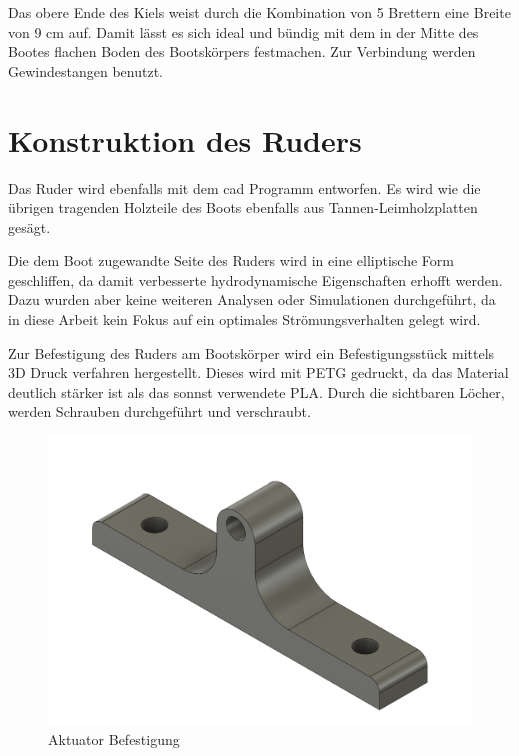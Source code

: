 Das obere Ende des Kiels weist durch die Kombination von 5 Brettern eine Breite von 9 cm auf. Damit lässt es sich ideal und bündig mit dem in der Mitte des Bootes flachen Boden des Bootskörpers festmachen. Zur Verbindung werden Gewindestangen benutzt.

\section{Konstruktion des Ruders}
Das Ruder wird ebenfalls mit dem \ac{cad} Programm entworfen. Es wird wie die übrigen tragenden Holzteile des Boots ebenfalls aus Tannen-Leimholzplatten gesägt.

Die dem Boot zugewandte Seite des Ruders wird in eine elliptische Form geschliffen, da damit verbesserte hydrodynamische Eigenschaften erhofft werden. Dazu wurden aber keine weiteren Analysen oder Simulationen durchgeführt, da in diese Arbeit kein Fokus auf ein optimales Strömungsverhalten gelegt wird.

Zur Befestigung des Ruders am Bootskörper wird ein Befestigungsstück mittels 3D Druck verfahren hergestellt. Dieses wird mit PETG gedruckt, da das Material deutlich stärker ist als das sonnst verwendete PLA. Durch die sichtbaren Löcher, werden Schrauben durchgeführt und verschraubt. 

\begin{figure}[H]
    \centering
    \includegraphics[width=0.5\linewidth]{assets/rudder_connector_image.png}
    \caption{Aktuator Befestigung}
    
\end{figure}